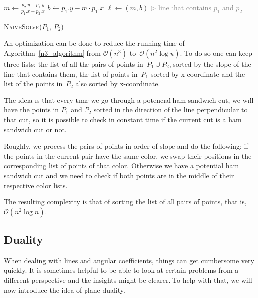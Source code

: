 \documentclass{article}
\renewcommand{\And}{\textbf{and} }
\def\bigo{\mathcal{O}}
\begin{document}
\begin{algorithm}
\begin{algorithmic}[1]

    \State $m \gets \frac{p_2.y - p_1.y}{p_1.x - p_2.x}$
    \State $b \gets p_1.y - m \cdot p_1.x $
        \State $\ell \gets (m,b)$ \hfill {\small \textcolor{gray}{$\rhd$ line that contains $p_1$ and $p_2$}}
    \If{\textsc{Bisects}($\ell$, $P_1$) \And \textsc{Bisects}($\ell$, $P_2$)} \Return{$\ell$}
    \EndIf
  \EndFor
 \EndFor
\end{algorithmic}
\caption{\textsc{NaiveSolve}($P_1$, $P_2$)}
\label{n3_algorithm}
\end{algorithm}

An optimization can be done to reduce the running time of Algorithm~\ref{n3_algorithm} from $\bigo(n^3)$ to~$\bigo(n^2 \log n)$.
%
To do so one can keep three lists: the list of all the pairs of points in~$P_1 \cup P_2$, sorted by the slope of the line that contains them, the list of points in~$P_1$ sorted by x-coordinate and the list of the points in~$P_2$ also sorted by x-coordinate.

The ideia is that every time we go through a potencial ham sandwich cut, we will have the points in $P_1$ and $P_2$ sorted in the direction of the line perpendicular to that cut, so it is possible to check in constant time if the current cut is a ham sandwich cut or not.

Roughly, we process the pairs of points in order of slope and do the following: if the points in the current pair have the same color, we swap their positions in the corresponding list of points of that color. Otherwise we have a potential ham sandwich cut and we need to check if both points are in the middle of their respective color lists.

The resulting complexity is that of sorting the list of all pairs of points, that is, $\bigo(n^2 \log n)$.

\newpage
\subsection{Duality}\label{sec:duality}

When dealing with lines and angular coefficients, things can get cumbersome very quickly. It is sometimes helpful to be able to look at certain problems from a different perspective and the insights might be clearer. To help with that, we will now introduce the idea of plane duality.
 
\end{document}
